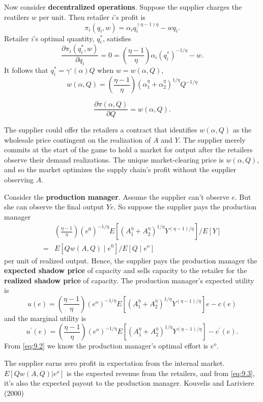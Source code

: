 Now consider \textbf{decentralized operations}. 
Suppose the supplier charges the reatilers $w$ per unit. Then retailer $i$'s profit is 
\begin{equation*}
    \pi_i(q_i,w)=\alpha_i q_i^{(\eta-1)\eta}-w q_i.
\end{equation*}
Retailer $i$'s optimal quantity, $q_{i}^{*}$, satisfies
$$
\frac{\partial \pi_{i}\left(q_{i}^{*}, w\right)}{\partial q_{i}}=0=\left(\frac{\eta-1}{\eta}\right) \alpha_{i}\left(q_{i}^{*}\right)^{-1 / \eta}-w .
$$
It follows that $q_{i}^{*}=\gamma^{\circ}(\alpha) Q$ when $w=w(\alpha, Q)$,
$$
w(\alpha, Q)=\left(\frac{\eta-1}{\eta}\right)\left(\alpha_{1}^{\eta}+\alpha_{2}^{\eta}\right)^{1 / \eta} Q^{-1 / \eta}
$$
\begin{note}
    $$\frac{\partial\pi(\alpha,Q)}{\partial Q}=w(\alpha,Q).$$
\end{note}

The supplier could offer the retailers a contract that identifies $w(\alpha,Q)$ as the wholesale price contingent on the realization of $A$ and $Y$. The supplier merely commits at the start of the game to hold a market for output after the retailers observe their demand realizations. The unique market-clearing price is $w(\alpha,Q)$, and so the market optimizes the supply chain's profit without the supplier observing $A$.

Consider the\textbf{ production manager}. Assume the supplier can't observe $e$. But she can observe the final output $Ye$. So suppose the supplier pays the production manager
\begin{equation}\label{eq:9.3}
    \begin{aligned}
        &\left(\frac{\eta-1}{\eta}\right)\left(e^{0}\right)^{-1 / \eta} E\left[\left(A_{1}^{\eta}+A_{2}^{\eta}\right)^{1 / \eta} Y^{(\eta-1) / \eta}\right] / E[Y]\\
        =&E\left[Q w(A, Q) \mid e^{0}\right] / E\left[Q \mid e^{\mathrm{o}}\right]
    \end{aligned}
\end{equation}
per unit of realized output. 
Hence, the supplier pays the production manager the \textbf{expected shadow price} of capacity and sells capacity to the retailer for the \textbf{realized shadow price} of capacity. The production manager's expected utility is 
$$
u(e)=\left(\frac{\eta-1}{\eta}\right)\left(e^{\mathrm{o}}\right)^{-1 / \eta} E\left[\left(A_{1}^{\eta}+A_{2}^{\eta}\right)^{1 / \eta} Y^{(\eta-1) / \eta}\right] e-c(e)
$$
and the marginal utility is
$$
u^{\prime}(e)=\left(\frac{\eta-1}{\eta}\right)\left(e^{\mathrm{o}}\right)^{-1 / \eta} E\left[\left(A_{1}^{\eta}+A_{2}^{\eta}\right)^{1 / \eta} Y^{(\eta-1) / \eta}\right]-c^{\prime}(e) .
$$
From \autoref{eq:9.2} we know the production manager's optimal effort is $e^o$. 
\begin{note}
    The supplier earns zero profit in expectation from the internal market. $E[Qw(A,Q)|e^o]$ is the expected revenue from the retailers, and from \autoref{eq:9.3}, it's also the expected payout to the production manager.
    Kouvelis and Lariviere (2000) 
\end{note}





